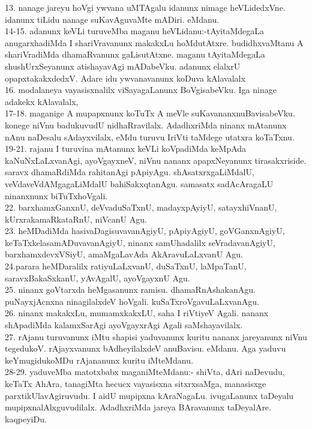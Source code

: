 \documentclass{article}
\begin{document}
13. nanage jareyu hoVgi ywvana uMTAgalu idanunx nimage heVLidedxVne. idanunx tiLidu nanage suKavAguvaMte mADiri. eMdanu.\\
14-15. adanunx keVLi turuveMba maganu heVLidanu:-tAyitaMdegaLa anugarxhadiMda I shariVravanunx makakxLu hoMdutAtxre. budidhxvaMtanu A shariVradiMda dhamaRvanunx gaLisutAtxne. maganu tAyitaMdegaLa shushUrxSeyanunx atishayavAgi mADabeVku. adanunx elalxrU opapxtakakxdedxV. Adare idu ywvanavanunx koDuva kAlavalalx\\
16. modalaneya vayasisxnalilx viSayagaLanunx BoVgisabeVku. Iga ninage adakekx kAlavalalx,\\
17-18. maganige A mupapxnunx koTuTx A meVle suKavananxnuBavisabeVku. konege niVnu badukuvudU nidhaRravilalx. AdadhxriMda ninanx mAtanunx nAnu naDesalu sAdayxvilalx, eMdu turuvu IriVti taMdege utatxra koTaTxnu.\\
19-21. rajanu I turuvina mAtanunx keVLi koVpadiMda keMpAda kaNuNxLaLxvanAgi, ayoVgayxneV, niVnu nananx apapxNeyanunx tirasakxriside. saravx dhamaRdiMda rahitanAgi pApiyAgu. shAsatxrxgaLiMdalU, veVdaveVdAMgagaLiMdalU bahiSakxqtanAgu. samasatx sadAcAragaLU ninanxnunx biTuTxhoVgali.\\
22. barxhamxGanxnU, deVvaduSaTxnU, madayxpAyiyU, satayxhiVnanU, kUrxrakamaRkataRnU, niVcanU Agu.\\
23. heMDadiMda hasivaDagisuvavanAgiyU, pApiyAgiyU, goVGanxnAgiyU, keTaTxkelasamADuvavanAgiyU, ninanx samUhadalilx seVradavanAgiyU, barxhamxdevxVSiyU, amaMgaLavAda AkAravuLaLxvanU Agu.\\
24.parara heMDaralilx ratiyuLaLxvanU, duSaTxnU, laMpaTanU, saravxBakaSxkanU, yAvAgalU, ayoVgayxnU Agu.\\
25. ninanx goVtarxda heMgasanunx ramisu. dhamaRnAshakanAgu. puNayxjAcnxna ninagilalxdeV hoVgali. kuSaTxroVgavuLaLxvanAgu.\\
26.  ninanx makakxLu, mumamxkakxLU, saha I riVtiyeV Agali. nananx shApadiMda kalamxSarAgi ayoVgayxrAgi Agali saMshayavilalx.\\
27. rAjanu turuvanunx iMtu shapisi yaduvanunx kuritu nananx jareyanunx niVnu tegedukoV. rAjayxvanunx bAdheyilalxdeV anuBavisu. eMdanu. Aga yaduvu keYmugidukoMDu rAjananunx kuritu iMteMdanu.\\
28-29. yaduveMba matotxbabx maganiMteMdanu:- shiVta, dAri naDevudu, keTaTx AhAra, tanagiMta hecucx vayasisxna sitxrxsaMga, manasisxge parxtikUlavAgiruvudu. I aidU mupipxna kAraNagaLu. ivugaLanunx taDeyalu mupipxnalAlxguvudilalx. AdadhxriMda jareya BAravanunx taDeyalAre. kaqpeyiDu.\\
\end{document}
